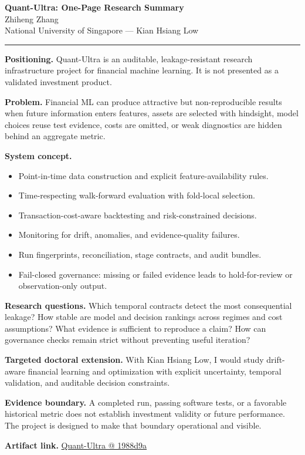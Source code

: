 \documentclass[11pt]{article}
\makeatletter
\newcommand{\ApplicantName}{Zhiheng Zhang}
\newcommand{\ApplicantGitHub}{\href{https://github.com/zhiheng-zhang-Mera/Quant-Ultra/tree/1988d9a8530da91a8158de864d098ea869098923}{Quant-Ultra @ 1988d9a}}
\makeatother
\begin{document}
\begin{center}
{\LARGE\bfseries Quant-Ultra: One-Page Research Summary}\\[0.25em]
{\large \ApplicantName}\\
National University of Singapore --- Kian Hsiang Low
\end{center}
\vspace{0.35em}\hrule\vspace{0.65em}

\textbf{Positioning.} Quant-Ultra is an auditable, leakage-resistant research infrastructure project for financial machine learning. It is not presented as a validated investment product.

\textbf{Problem.} Financial ML can produce attractive but non-reproducible results when future information enters features, assets are selected with hindsight, model choices reuse test evidence, costs are omitted, or weak diagnostics are hidden behind an aggregate metric.

\textbf{System concept.}
\begin{itemize}
\item Point-in-time data construction and explicit feature-availability rules.
\item Time-respecting walk-forward evaluation with fold-local selection.
\item Transaction-cost-aware backtesting and risk-constrained decisions.
\item Monitoring for drift, anomalies, and evidence-quality failures.
\item Run fingerprints, reconciliation, stage contracts, and audit bundles.
\item Fail-closed governance: missing or failed evidence leads to hold-for-review or observation-only output.
\end{itemize}

\textbf{Research questions.} Which temporal contracts detect the most consequential leakage? How stable are model and decision rankings across regimes and cost assumptions? What evidence is sufficient to reproduce a claim? How can governance checks remain strict without preventing useful iteration?

\textbf{Targeted doctoral extension.} With Kian Hsiang Low, I would study drift-aware financial learning and optimization with explicit uncertainty, temporal validation, and auditable decision constraints.

\textbf{Evidence boundary.} A completed run, passing software tests, or a favorable historical metric does not establish investment validity or future performance. The project is designed to make that boundary operational and visible.

\textbf{Artifact link.} \ApplicantGitHub
\end{document}

